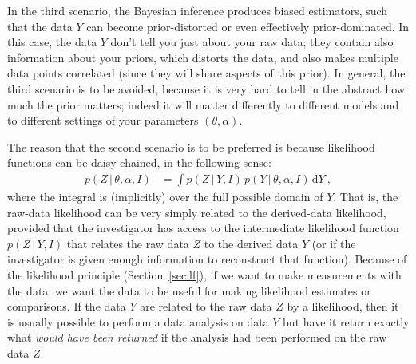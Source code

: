 \documentclass{article}
\newcommand{\sectionname}{Section}
\newcommand{\secref}[1]{\sectionname~\ref{#1}}
\newcommand{\dd}{\mathrm{d}}
\newcommand{\given}{\,|\,}
\begin{document}
In the third scenario, the Bayesian inference produces biased estimators, such that the data $Y$ can become prior-distorted or even effectively prior-dominated.
In this case, the data $Y$ don’t tell you just about your raw data; they contain also information about your priors, which distorts the data, and also makes multiple data points correlated (since they will share aspects of this prior).
In general, the third scenario is to be avoided, because it is very hard to tell in the abstract how much the prior matters; indeed it will matter differently to different models and to different settings of your parameters $(\theta,\alpha)$.

The reason that the second scenario is to be preferred is because likelihood functions can be daisy-chained, in the following sense:
\begin{align}
    p(Z\given\theta,\alpha,I) &= \int p(Z\given Y,I)\,p(Y\given\theta,\alpha,I)\,\dd Y ~,\label{eq:ZtoY}
\end{align}
where the integral is (implicitly) over the full possible domain of $Y$.
That is, the raw-data likelihood can be very simply related to the derived-data likelihood, provided that the investigator has access to the intermediate likelihood function $p(Z\given Y,I)$ that relates the raw data $Z$ to the derived data $Y$ (or if the investigator is given enough information to reconstruct that function).
Because of the likelihood principle (\secref{sec:lf}), if we want to make measurements with the data, we want the data to be useful for making likelihood estimates or comparisons.
If the data $Y$ are related to the raw data $Z$ by a likelihood, then it is usually possible to perform a data analysis on data $Y$ but have it return exactly what \emph{would have been returned} if the analysis had been performed on the raw data $Z$.
\end{document}
